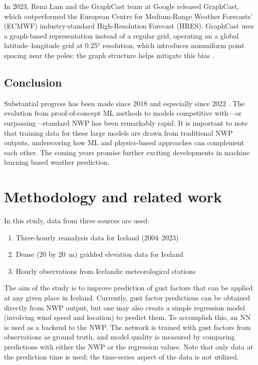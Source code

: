 In 2023, Remi Lam and the GraphCast team at Google released GraphCast, which outperformed the European Centre for Medium-Range Weather Forecasts’ (ECMWF) industry-standard High-Resolution Forecast (HRES). GraphCast uses a graph-based representation instead of a regular grid, operating on a global latitude–longitude grid at 0.25° resolution, which introduces nonuniform point spacing near the poles; the graph structure helps mitigate this bias \parencite{GraphCast}.

\subsection{Conclusion}
Substantial progress has been made since 2018 and especially since 2022 \parencite{SecondRevolution}. The evolution from proof-of-concept ML methods to models competitive with—or surpassing—standard NWP has been remarkably rapid. It is important to note that training data for these large models are drawn from traditional NWP outputs, underscoring how ML and physics-based approaches can complement each other. The coming years promise further exciting developments in machine learning based weather prediction.

\section{Methodology and related work}\label{sec:methodology}

In this study, data from three sources are used:

\begin{enumerate}[label=\textbf{\arabic*}.,rightmargin=1.5em]
  \item Three-hourly reanalysis data for Iceland (2004–2023)
  \item Dense (20 by 20~m) gridded elevation data for Iceland
  \item Hourly observations from Icelandic meteorological stations
\end{enumerate}

The aim of the study is to improve prediction of gust factors that can be applied at any given place in Iceland. Currently, gust factor predictions can be obtained directly from NWP output, but one may also create a simple regression model (involving wind speed and location) to predict them. To accomplish this, an NN is used as a backend to the NWP. The network is trained with gust factors from observations as ground truth, and model quality is measured by comparing predictions with either the NWP or the regression values. Note that only data at the prediction time is used; the time-series aspect of the data is not utilized.

